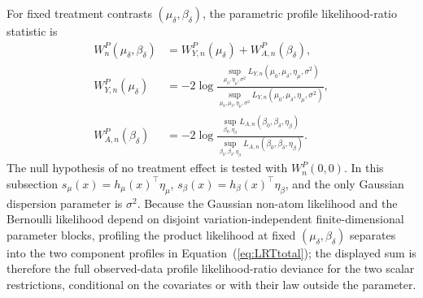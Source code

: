 \documentclass[11pt]{article}
\begin{document}
For fixed treatment contrasts $(\mu_\delta,\beta_\delta)$, the parametric profile likelihood-ratio statistic is
\begin{equation}
\label{eq:LRTtotal}
\begin{aligned}
  W_n^P(\mu_\delta, \beta_\delta)
  &= W_{Y,n}^P(\mu_\delta) + W_{A,n}^P(\beta_\delta),\\
  W_{Y,n}^P(\mu_\delta)
  &= -2\log \frac{\sup\limits_{\mu_0, \eta_\mu, \sigma^2} L_{Y,n}(\mu_0, \mu_\delta, \eta_\mu, \sigma^2)}
  {\sup\limits_{\mu_0, \mu_\delta, \eta_\mu, \sigma^2} L_{Y,n}(\mu_0, \mu_\delta, \eta_\mu, \sigma^2)},\\
  W_{A,n}^P(\beta_\delta)
  &= -2\log \frac{\sup\limits_{\beta_0, \eta_\beta} L_{A,n}(\beta_0, \beta_\delta, \eta_\beta)}
  {\sup\limits_{\beta_0, \beta_\delta, \eta_\beta} L_{A,n}(\beta_0, \beta_\delta, \eta_\beta)}.
\end{aligned}
\end{equation}
The null hypothesis of no treatment effect is tested with $W_n^P(0,0)$.
In this subsection $s_\mu(x)=h_\mu(x)^\top\eta_\mu$, $s_\beta(x)=h_\beta(x)^\top\eta_\beta$, and the only Gaussian dispersion parameter is $\sigma^2$. Because the Gaussian non-atom likelihood and the Bernoulli likelihood depend on disjoint variation-independent finite-dimensional parameter blocks, profiling the product likelihood at fixed $(\mu_\delta,\beta_\delta)$ separates into the two component profiles in Equation~(\ref{eq:LRTtotal}); the displayed sum is therefore the full observed-data profile likelihood-ratio deviance for the two scalar restrictions, conditional on the covariates or with their law outside the parameter.
\end{document}
